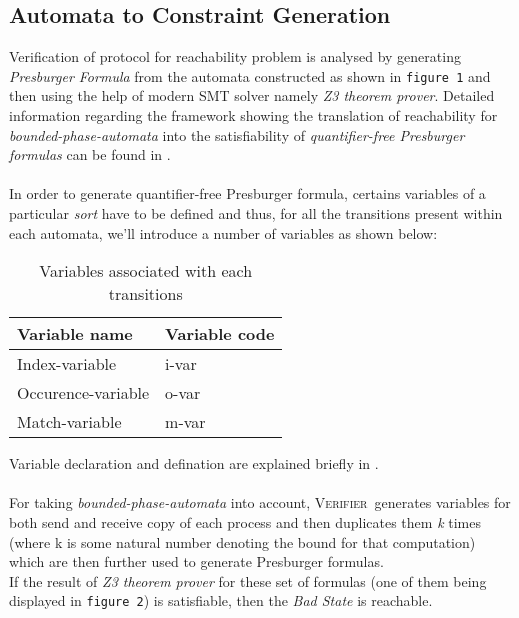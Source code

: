 \documentclass[a4paper]{article}
\newcommand{\verifier}{\textsc{Verifier}}
\begin{document}
\subsection{Automata to Constraint Generation}

Verification of protocol for reachability problem is analysed by generating \emph{Presburger Formula} from the automata 
constructed as shown in {\tt figure 1} and then using the help of modern SMT solver namely \emph{Z3 theorem prover}. 
Detailed information regarding the framework showing the translation of reachability for \emph{bounded-phase-automata} 
into the satisfiability of \emph{quantifier-free Presburger formulas} can be found in \cite{AAC13}.\\\\

In order to generate quantifier-free Presburger formula, certains variables of a particular \emph{sort} have to be 
defined and thus, for all the transitions present within each automata, we'll introduce a number of variables as shown below:

\begin{table}[ht]
  \begin{center}
    \begin{tabular}{|l|l|}
      \hline
      Variable name & Variable code\\
      \hline
      Index-variable & i-var\\
      Occurence-variable & o-var\\
      Match-variable & m-var\\
      \hline
    \end{tabular}
  \end{center}
  \caption{Variables associated with each transitions}
  \label{tbl:locvarnames}
\end{table}

Variable declaration and defination are explained briefly in \cite{AAC13}.\\\\
For taking \emph{bounded-phase-automata} into account, \verifier\ generates variables for both send and receive copy of 
each process and then duplicates them \emph{k} times (where k is some natural number denoting the bound for that computation) 
which are then further used to generate Presburger formulas.\\
If the result of \emph{Z3 theorem prover} for these set of formulas (one of them being displayed in {\tt figure 2}) is 
satisfiable, then the \emph{Bad State} is reachable.
\end{document}

